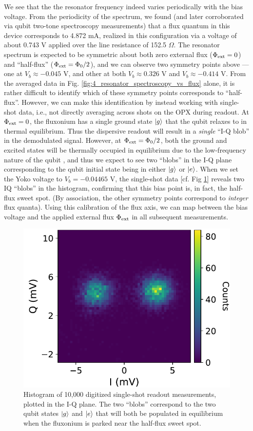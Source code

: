 We see that the the resonator frequency indeed varies periodically with the bias voltage. From the periodicity of the spectrum, we found (and later corroborated via qubit two-tone spectroscopy measurements) that a flux quantum in this device corresponds to 4.872 mA, realized in this configuration via a voltage of about 0.743 V applied over the line resistance of 152.5 $\Omega$. The resonator spectrum is expected to be symmetric about both zero external flux ($\Phi_{\rm ext} = 0$) and ``half-flux'' ($\Phi_{\rm ext} = \Phi_0/2$), and we can observe two symmetry points above --- one at $V_b \approx -0.045$ V, and other at both $V_b \approx 0.326$ V and $V_b \approx -0.414$ V. From the averaged data in Fig. \ref{fig:4_resonator_spectroscopy_vs_flux} alone, it is rather difficult to identify which of these symmetry points corresponds to ``half-flux''. However, we can make this identification by instead working with single-shot data, i.e., not directly averaging across shots on the OPX during readout. At $\Phi_{\rm ext} = 0$, the fluxonium has a single ground state $\lvert g\rangle$ that the qubit relaxes to in thermal equilibrium. Thus the dispersive readout will result in a \textit{single} ``I-Q blob'' in the demodulated signal. However, at $\Phi_{\rm ext} = \Phi_0/2$, both the ground and excited states will be thermally occupied in equilibrium due to the low-frequency nature of the qubit \cite{manenti2023quantum}, and thus we expect to see two ``blobs'' in the I-Q plane corresponding to the qubit initial state being in either $\lvert g\rangle$ or $\lvert e\rangle$. When we set the Yoko voltage to $V_b = -0.04465$ V, the single-shot data [cf. Fig \ref{fig:4_single_shots}] reveals two IQ ``blobs'' in the histogram, confirming that this bias point is, in fact, the half-flux sweet spot. (By association, the other symmetry points correspond to \textit{integer} flux quanta). Using this calibration of the flux axis, we can map between the bias voltage and the applied external flux $\Phi_{\rm ext}$ in all subsequent measurements. 

\begin{figure}[h]
    \centering
    \includegraphics[width=0.51\linewidth]{Figures/4/single_shots.pdf}
    \caption[Readout I-Q histogram for a fluxonium parked at half-flux.]{Histogram of 10,000 digitized single-shot readout measurements, plotted in the I-Q plane. The two ``blobs'' correspond to the two qubit states $\lvert g\rangle$ and $\lvert e\rangle$ that will both be populated in equilibrium when the fluxonium is parked near the half-flux sweet spot.}
\label{fig:4_single_shots}
\end{figure}


